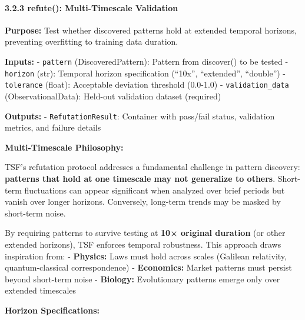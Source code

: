 \documentclass[
]{article}
\begin{document}
\paragraph{3.2.3 refute(): Multi-Timescale
Validation}\label{refute-multi-timescale-validation}

\textbf{Purpose:} Test whether discovered patterns hold at extended
temporal horizons, preventing overfitting to training data duration.

\textbf{Inputs:} - \texttt{pattern} (DiscoveredPattern): Pattern from
discover() to be tested - \texttt{horizon} (str): Temporal horizon
specification (``10x'', ``extended'', ``double'') - \texttt{tolerance}
(float): Acceptable deviation threshold (0.0-1.0) -
\texttt{validation\_data} (ObservationalData): Held-out validation
dataset (required)

\textbf{Outputs:} - \texttt{RefutationResult}: Container with pass/fail
status, validation metrics, and failure details

\textbf{Multi-Timescale Philosophy:}

TSF's refutation protocol addresses a fundamental challenge in pattern
discovery: \textbf{patterns that hold at one timescale may not
generalize to others}. Short-term fluctuations can appear significant
when analyzed over brief periods but vanish over longer horizons.
Conversely, long-term trends may be masked by short-term noise.

By requiring patterns to survive testing at \textbf{10× original
duration} (or other extended horizons), TSF enforces temporal
robustness. This approach draws inspiration from: - \textbf{Physics:}
Laws must hold across scales (Galilean relativity, quantum-classical
correspondence) - \textbf{Economics:} Market patterns must persist
beyond short-term noise - \textbf{Biology:} Evolutionary patterns emerge
only over extended timescales

\textbf{Horizon Specifications:}
\end{document}
